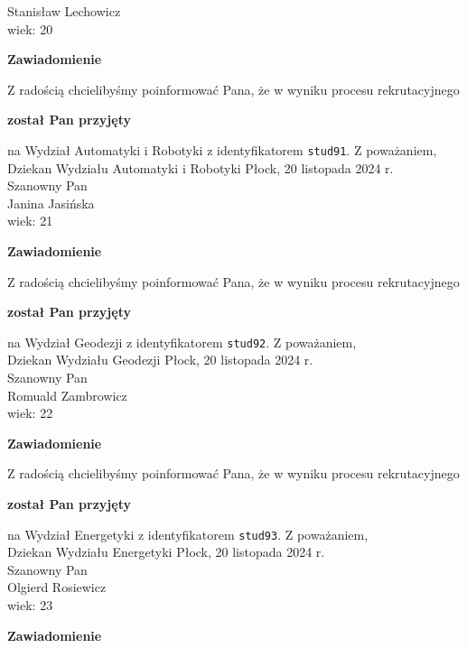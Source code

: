 \documentclass[12pt,a4paper]{article}
\begin{document}
Stanisław Lechowicz \\
wiek: 20
\bigskip
\begin{center}
 	{\Large\textbf{Zawiadomienie}}
\end{center}
\bigskip
Z radością chcielibyśmy poinformować Pana, że w wyniku procesu rekrutacyjnego 
\begin{center}
\textsf{\textbf{został Pan przyjęty}} 
\end{center}
na Wydział Automatyki i Robotyki z identyfikatorem \verb|stud91|. 
\vspace{2cm}
\noindent
Z poważaniem,\\
Dziekan
Wydziału Automatyki i Robotyki
\newpage
\hfill Płock, 20 listopada 2024 r.\\
\noindent 
Szanowny Pan \\
Janina Jasińska \\
wiek: 21
\bigskip
\begin{center}
 	{\Large\textbf{Zawiadomienie}}
\end{center}
\bigskip
Z radością chcielibyśmy poinformować Pana, że w wyniku procesu rekrutacyjnego 
\begin{center}
\textsf{\textbf{został Pan przyjęty}} 
\end{center}
na Wydział Geodezji z identyfikatorem \verb|stud92|. 
\vspace{2cm}
\noindent
Z poważaniem,\\
Dziekan
Wydziału Geodezji
\newpage
\hfill Płock, 20 listopada 2024 r.\\
\noindent 
Szanowny Pan \\
Romuald Zambrowicz \\
wiek: 22
\bigskip
\begin{center}
 	{\Large\textbf{Zawiadomienie}}
\end{center}
\bigskip
Z radością chcielibyśmy poinformować Pana, że w wyniku procesu rekrutacyjnego 
\begin{center}
\textsf{\textbf{został Pan przyjęty}} 
\end{center}
na Wydział Energetyki z identyfikatorem \verb|stud93|. 
\vspace{2cm}
\noindent
Z poważaniem,\\
Dziekan
Wydziału Energetyki
\newpage
\hfill Płock, 20 listopada 2024 r.\\
\noindent 
Szanowny Pan \\
Olgierd Rosiewicz \\
wiek: 23
\bigskip
\begin{center}
 	{\Large\textbf{Zawiadomienie}}
\end{center}
\end{document}
